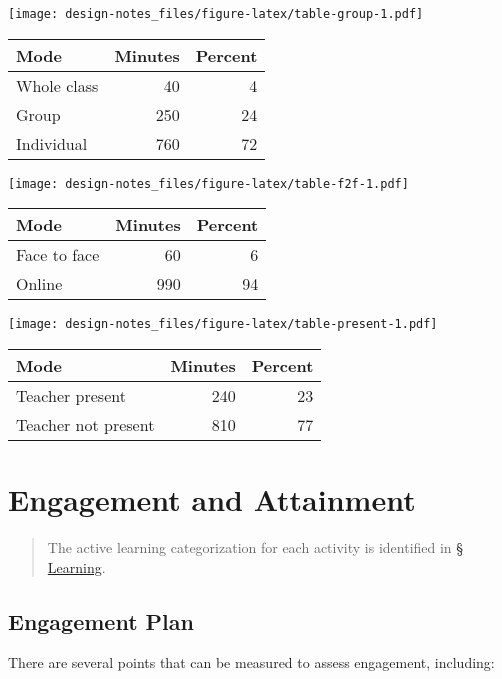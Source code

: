 \documentclass[
]{book}
\begin{document}
\texttt{[image: design-notes\_files/figure-latex/table-group-1.pdf]}

\begin{tabular}{l|r|r}
\hline
Mode & Minutes & Percent\\
\hline
Whole class & 40 & 4\\
\hline
Group & 250 & 24\\
\hline
Individual & 760 & 72\\
\hline
\end{tabular}

\texttt{[image: design-notes\_files/figure-latex/table-f2f-1.pdf]}

\begin{tabular}{l|r|r}
\hline
Mode & Minutes & Percent\\
\hline
Face to face & 60 & 6\\
\hline
Online & 990 & 94\\
\hline
\end{tabular}

\texttt{[image: design-notes\_files/figure-latex/table-present-1.pdf]}

\begin{tabular}{l|r|r}
\hline
Mode & Minutes & Percent\\
\hline
Teacher present & 240 & 23\\
\hline
Teacher not present & 810 & 77\\
\hline
\end{tabular}

\hypertarget{engagement}{%
\chapter{Engagement and Attainment}\label{engagement}}

\begin{quote}
The active learning categorization for each activity is identified in \protect\hyperlink{learning}{§ Learning}.
\end{quote}

\hypertarget{engagement-plan}{%
\section{Engagement Plan}\label{engagement-plan}}

There are several points that can be measured to assess engagement, including:
\end{document}
